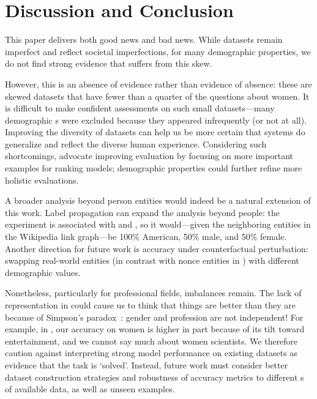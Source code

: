 
\section{Discussion and Conclusion}
\label{sec:conclusion}

This paper delivers both good news and bad news.
While datasets remain imperfect and reflect societal imperfections, for many demographic properties, we do not find strong evidence that  suffers from this skew.

However, this is an absence of evidence rather than evidence of absence: these are skewed datasets that have fewer than a quarter of the questions about women.
It is difficult to make confident assessments on such small datasets---many demographic \demorow{}s were excluded because they appeared infrequently (or not at all).
Improving the diversity of  datasets can help us be more certain that  systems do generalize and reflect the diverse human experience.
Considering such shortcomings, \citet{Rodriguez_2021} advocate improving evaluation by focusing on more important examples for ranking models; demographic properties could further refine more holistic evaluations.


A broader analysis beyond person entities would indeed be a natural extension of this work. Label propagation can expand the analysis beyond people: the  experiment is associated with  and , so it would—given the neighboring entities in the Wikipedia link graph—be 100\% American, 50\% male, and 50\% female.
Another direction for future work is accuracy under counterfactual perturbation: swapping real-world entities (in contrast with nonce entities in \citet{li-20}) with different demographic values.

Nonetheless, particularly for professional fields, imbalances remain.
The lack of representation in  could cause us to think that things are better than they are because of Simpson's paradox~\cite{blyth-72}: gender and profession are not independent!
For example, in \nq{}, our accuracy on women is higher in part because of its tilt toward entertainment, and we cannot say much about women scientists.
We therefore caution against interpreting strong model performance on existing  datasets as evidence that the task is ‘solved’.
Instead, future work must consider better dataset construction strategies and robustness of accuracy metrics to different \demosubset{}s of available data, as well as unseen examples.

